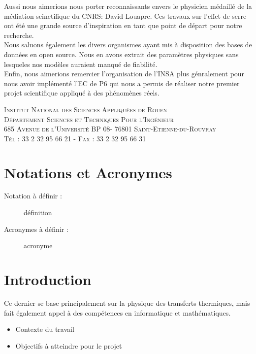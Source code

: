 \documentclass[a4paper, 12pt]{report} %
\begin{document}
	\indent Aussi nous aimerions nous porter reconnaissants 
	envers le physicien médaillé de la médiation scinetifique
	du CNRS: David Louapre. Ces travaux sur l'effet de serre 
	ont été une grande source d'inspiration en tant que point 
	de départ pour notre recherche. \\

	\indent Nous saluons également les divers organismes ayant 
	mis à disposition des bases de données en open source. Nous
	en avons extrait des paramètres physiques sans lesqueles 
	nos modèles auraient manqué de fiabilité. \\

	\indent Enfin, nous aimerions remercier l'organisation de 
	l'INSA plus génralement pour nous avoir implémenté l'EC de P6
	qui nous a permis de réaliser notre premier projet 
	scientifique appliqué à des phénomènes réels. 
\vfill


\begin{center}
	\scshape Institut National des Sciences Appliquées de Rouen \\
	Département Sciences et Techniques Pour l'Ingénieur \\
	685 Avenue de l'Université BP 08- 76801 Saint-Etienne-du-Rouvray \\ Tél : 33 2 32 95 66 21 - Fax : 33 2 32 95 66 31
\end{center}

\newpage
\pagestyle{courant} 
	\setcounter{tocdepth}{2}
	\tableofcontents

  
	\chapter*{Notations et Acronymes}		%

\begin{description}
	\item[Notation à définir :] définition
	\item[Acronymes à définir :] acronyme
\end{description}

\newpage
	\chapter*{Introduction}				%
	Ce dernier se base principalement 
	sur la physique des transferts thermiques, mais fait également
	appel à des compétences en informatique et mathématiques. 
	\begin{itemize}
	\item Contexte du travail
	\item Objectifs à atteindre pour le projet
	\end{itemize}
\end{document}
